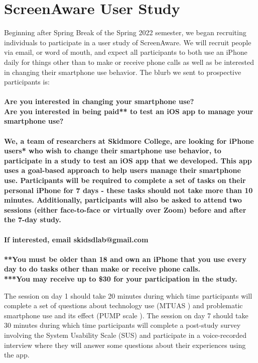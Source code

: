 \documentclass[12pt, title page, manuscript, nonacm]{acmart}
\begin{document}
\section*{ScreenAware User Study}
Beginning after Spring Break of the Spring 2022 semester, we began recruiting individuals to participate in a user study of ScreenAware. 
We will recruit people via email, or word of mouth, and expect all participants to both use an iPhone daily for things other than to make or receive phone calls as well as be interested in changing their smartphone use behavior. The blurb we sent to prospective participants is:\\\\ \textbf{Are you interested in changing your smartphone use? \\ Are you interested in being paid** to test an iOS app to manage your smartphone use? \\ \\We, a team of researchers at Skidmore College, are looking for iPhone users* who wish to change their smartphone use behavior, to participate in a study to test an iOS app that we developed. This app uses a goal-based approach to help users manage their smartphone use. Participants will be required to complete a set of tasks on their personal iPhone for 7 days - these tasks should not take more than 10 minutes. Additionally, participants will also be asked to attend two sessions (either face-to-face or virtually over Zoom) before and after the 7-day study.\\ \\ If interested, email skidsdlab@gmail.com \\\\ **You must be older than 18 and own an iPhone that you use every day to do tasks other than make or receive phone calls. \\ ***You may receive up to \$30 for your participation in the study.}
\\ 
\par The session on day 1 should take 20 minutes during which time participants will complete a set of questions about technology use (MTUAS \cite{rosen2013media}) and problematic smartphone use and its effect (PUMP scale \cite{merlo2013measuring}).  The session on day 7 should take 30 minutes during which time participants will complete a post-study survey involving the System Usability Scale (SUS)\cite{sus} and participate in a voice-recorded interview where they will answer some questions about their experiences using the app. 
\par 
\end{document}
